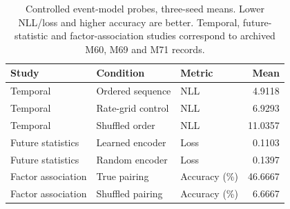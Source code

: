 \begin{table}[tbp]
\centering\small
\caption{Controlled event-model probes, three-seed means. Lower NLL/loss and higher accuracy are better. Temporal, future-statistic and factor-association studies correspond to archived M60, M69 and M71 records.}
\label{tab:probes}
\begin{tabular}{@{}lllr@{}}
\toprule
Study & Condition & Metric & Mean \\
\midrule
Temporal & Ordered sequence & NLL & 4.9118 \\
Temporal & Rate-grid control & NLL & 6.9293 \\
Temporal & Shuffled order & NLL & 11.0357 \\
Future statistics & Learned encoder & Loss & 0.1103 \\
Future statistics & Random encoder & Loss & 0.1397 \\
Factor association & True pairing & Accuracy (\%) & 46.6667 \\
Factor association & Shuffled pairing & Accuracy (\%) & 6.6667 \\
\bottomrule
\end{tabular}
\end{table}
